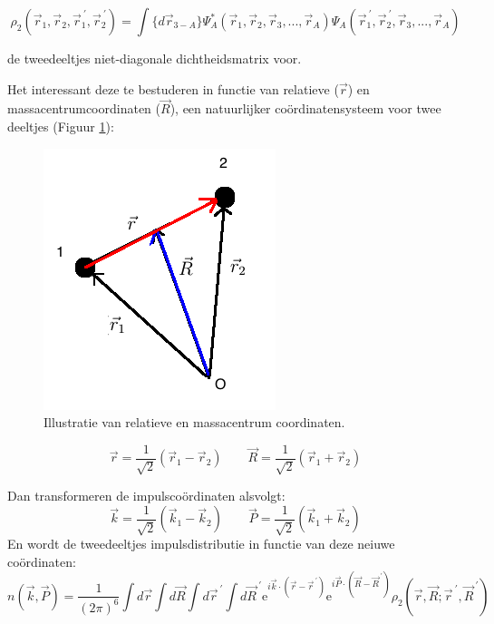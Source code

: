 \documentclass[12pt]{article}
\begin{document}
\begin{equation}
\rho_2(\vec{r}_1,\vec{r}_2, \vec{r}_1^{\ \prime},\vec{r}_2^{\ \prime}) = \int \{d\vec{r}_{3-A}\} \Psi^*_A(\vec{r}_1,\vec{r}_2,\vec{r}_3, ... ,\vec{r}_A)\Psi_A(\vec{r}_1^{\ \prime},\vec{r}_2^{\ \prime},\vec{r}_3, ... ,\vec{r}_A)
\end{equation}

de tweedeeltjes niet-diagonale dichtheidsmatrix voor.

Het interessant deze te bestuderen in functie van relatieve ($\vec{r}$) en massacentrumcoordinaten ($\vec{R}$), een natuurlijker co\"{o}rdinatensysteem voor twee deeltjes (Figuur \ref{fig:coordinates}):

\begin{figure}
\centering
\includegraphics[scale=0.6]{coordinates.png}
\caption{ Illustratie van relatieve en massacentrum coordinaten.}
\label{fig:coordinates}
\end{figure}
\begin{equation}
\vec{r}= \frac{1}{\sqrt{2}} \left(\vec{r}_1 - \vec{r}_2\right)  \qquad \vec{R}= \frac{1}{\sqrt{2}} \left(\vec{r}_1 + \vec{r}_2\right)
\end{equation}

Dan transformeren de impulsco\"{o}rdinaten alsvolgt:
\begin{equation}
\vec{k}= \frac{1}{\sqrt{2}} \left(\vec{k}_1 - \vec{k}_2\right) \qquad \vec{P}= \frac{1}{\sqrt{2}} \left(\vec{k}_1 + \vec{k}_2\right)
\end{equation}
En wordt de tweedeeltjes impulsdistributie in functie van deze neiuwe co\"{o}rdinaten:
\begin{equation}
n(\vec{k},\vec{P})=\frac{1}{(2\pi)^6}
						\int d\vec{r} \int d\vec{R} \int d\vec{r}^{\ \prime} \int d\vec{R}^{\ \prime} 
    						\mathrm{e}^{i\vec{k}\cdot (\vec{r}-\vec{r}^{\ \prime})} 
    						\mathrm{e}^{i\vec{P}\cdot(\vec{R}-\vec{R}^{\ \prime})} 
    						\rho_2(\vec{r},\vec{R}; \vec{r}^{\ \prime},\vec{R}^{\ \prime})
\end{equation}
\end{document}
